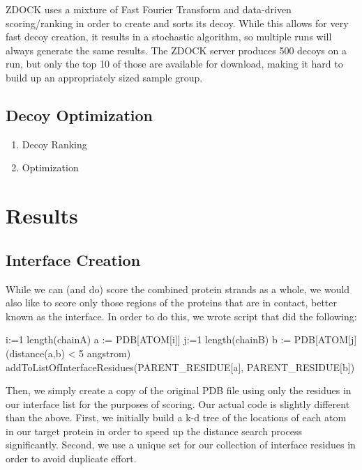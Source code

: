\documentclass{article}
\begin{document}
ZDOCK uses a mixture of Fast Fourier Transform and data-driven scoring/ranking in order to create and sorts its decoy. While this allows for very fast decoy creation, it results in a stochastic algorithm, so multiple runs will always generate the same results. The ZDOCK server produces 500 decoys on a run, but only the top 10 of those are available for download, making it hard to build up an appropriately sized sample group.

\subsection{Decoy Optimization}

\begin{enumerate}

\item Decoy Ranking

\item Optimization

\end{enumerate}



\section{Results}



\subsection{Interface Creation}

While we can (and do) score the combined protein strands as a whole, we would also like to score only those regions of the proteins that are in contact, better known as the interface.  In order to do this, we wrote script that did the following:\\

\begin{program}
  \FOR i:=1 \TO length(chainA)  \DO
	a := PDB[ATOM[i]]
    \FOR j:=1 \TO length(chainB)  \DO
	b := PDB[ATOM[j]
    \IF (distance(a,b) < 5 angstrom) \DO
        addToListOfInterfaceResidues(PARENT_RESIDUE[a], PARENT_RESIDUE[b])      
    \END
   \END
\END
\end{program}

Then, we simply create a copy of the original PDB file using only the residues in our interface list for the purposes of scoring.  Our actual code is slightly different than the above.  First, we initially build a k-d tree of the locations of each atom in our target protein in order to speed up the distance search process significantly.  Second, we use a unique set for our collection of interface residues in order to avoid duplicate effort.\\
\end{document}
